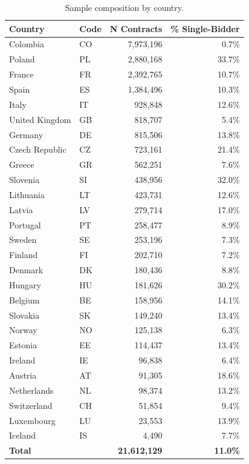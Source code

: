 \documentclass[11pt]{article}
\begin{document}
\begin{table}[H]
\centering
\caption{Sample composition by country.}
\label{tab:countries}
\begin{tabular}{llrr}
\toprule
\textbf{Country} & \textbf{Code} & \textbf{N Contracts} & \textbf{\% Single-Bidder} \\
\midrule
Colombia & CO & 7,973,196 & 0.7\% \\
Poland & PL & 2,880,168 & 33.7\% \\
France & FR & 2,392,765 & 10.7\% \\
Spain & ES & 1,384,496 & 10.3\% \\
Italy & IT & 928,848 & 12.6\% \\
United Kingdom & GB & 818,707 & 5.4\% \\
Germany & DE & 815,506 & 13.8\% \\
Czech Republic & CZ & 723,161 & 21.4\% \\
Greece & GR & 562,251 & 7.6\% \\
Slovenia & SI & 438,956 & 32.0\% \\
Lithuania & LT & 423,731 & 12.6\% \\
Latvia & LV & 279,714 & 17.0\% \\
Portugal & PT & 258,477 & 8.9\% \\
Sweden & SE & 253,196 & 7.3\% \\
Finland & FI & 202,710 & 7.2\% \\
Denmark & DK & 180,436 & 8.8\% \\
Hungary & HU & 181,626 & 30.2\% \\
Belgium & BE & 158,956 & 14.1\% \\
Slovakia & SK & 149,240 & 13.4\% \\
Norway & NO & 125,138 & 6.3\% \\
Estonia & EE & 114,437 & 13.4\% \\
Ireland & IE & 96,838 & 6.4\% \\
Austria & AT & 91,305 & 18.6\% \\
Netherlands & NL & 98,374 & 13.2\% \\
Switzerland & CH & 51,854 & 9.4\% \\
Luxembourg & LU & 23,553 & 13.9\% \\
Iceland & IS & 4,490 & 7.7\% \\
\midrule
\textbf{Total} & & \textbf{21,612,129} & \textbf{11.0\%} \\
\bottomrule
\end{tabular}
\end{table}
\end{document}
